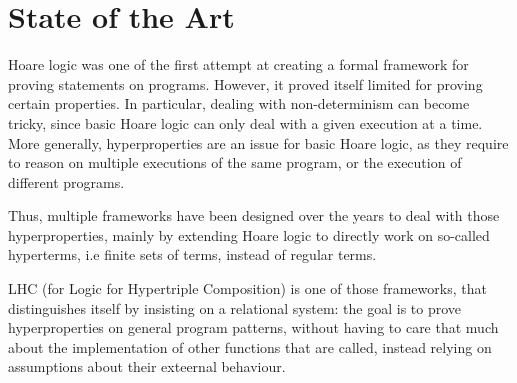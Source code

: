 \section{State of the Art}

Hoare logic was one of the first attempt at creating a formal framework for proving statements on programs. However, it proved itself limited for proving certain properties. In particular, dealing with non-determinism can become tricky, since basic Hoare logic can only deal with a given execution at a time. More generally, hyperproperties are an issue for basic Hoare logic, as they require to reason on multiple executions of the same program, or the execution of different programs.

Thus, multiple frameworks have been designed over the years to deal with those hyperproperties, mainly by extending Hoare logic to directly work on so-called hyperterms, i.e finite sets of terms, instead of regular terms.

LHC (for Logic for Hypertriple Composition) is one of those frameworks, that distinguishes itself by insisting on a relational system: the goal is to prove hyperproperties on general program patterns, without having to care that much about the implementation of other functions that are called, instead relying on assumptions about their exteernal behaviour.